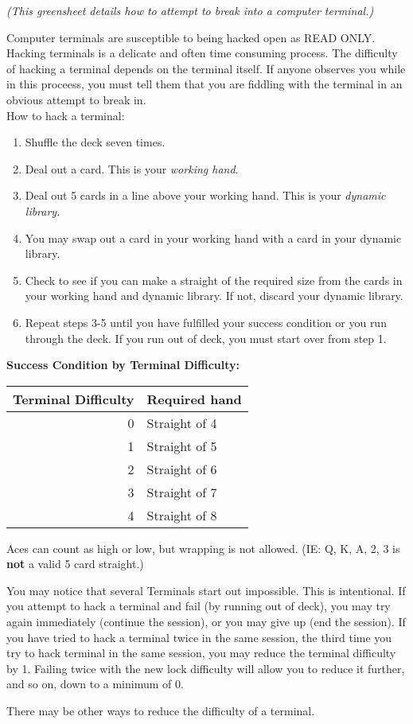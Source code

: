 \documentclass[green]{guildcamp4}
\begin{document}
\name{\gHacking{}}

\emph{(This greensheet details how to attempt to break into a computer terminal.)}

Computer terminals are susceptible to being hacked open as READ ONLY. Hacking terminals is a delicate and often time consuming process. The difficulty of hacking a terminal depends on the terminal itself. If anyone observes you while in this proceess, you must tell them that you are fiddling with the terminal in an obvious attempt to break in.\\

How to hack a terminal:
\begin{enumerate}
	\item Shuffle the deck seven times.
	\item Deal out a card. This is your {\em working hand}.
	\item Deal out 5 cards in a line above your working hand. This is your {\em dynamic library}.
	\item You may swap out a card in your working hand with a card in your dynamic library.
	\item Check to see if you can make a straight of the required size from the cards in your working hand and dynamic library. If not, discard your dynamic library.
	\item Repeat steps 3-5 until you have fulfilled your success condition or you run through the deck.  If you run out of deck, you must start over from step 1.
\end{enumerate}

{\bf Success Condition by Terminal Difficulty:}\\
\begin{tabular}{||r|l||}
	\hline\hline
	Terminal Difficulty	& Required hand\\
	\hline
	0	& Straight of 4\\
	1	& Straight of 5\\
	2	& Straight of 6\\
	3	& Straight of 7\\
	4	& Straight of 8\\
	\hline\hline 
\end{tabular}

\vspace{10 mm}

Aces can count as high or low, but wrapping is not allowed. (IE: Q, K, A, 2, 3 is {\bf not} a valid 5 card straight.)

You may notice that several Terminals start out impossible. This is intentional. If you attempt to hack a terminal and fail (by running out of deck), you may try again immediately (continue the session), or you may give up (end the session). If you have tried to hack a terminal twice in the same session, the third time you try to hack terminal in the same session, you may reduce the terminal difficulty by 1. Failing twice with the new lock difficulty will allow you to reduce it further, and so on, down to a minimum of 0.

There may be other ways to reduce the difficulty of a terminal.
\end{document}
